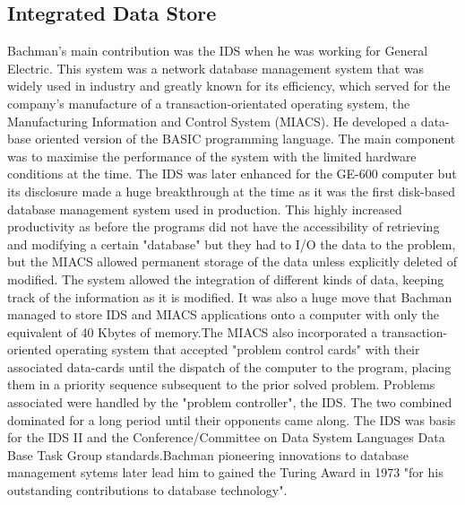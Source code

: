 \documentclass[a4paper]{article}
\begin{document}
\subsection{Integrated Data Store}
Bachman's main contribution was the IDS when he was working for General Electric. This system was a network database management system that was widely used in industry and greatly known for its efficiency, which served for the company's manufacture of a transaction-orientated operating system, the Manufacturing Information and Control System (MIACS). He developed a data-base oriented version of the BASIC programming language. The main component was to maximise the performance of the system with the limited hardware conditions at the time.
\bigbreak
The IDS was later enhanced for the GE-600 computer but its disclosure  made a huge breakthrough at the time as it was the first disk-based database management system used in production. This highly increased productivity as before the programs did not have the accessibility of retrieving and modifying a certain "database" but they had to I/O the data to the problem, but the MIACS allowed permanent storage of the data unless explicitly deleted of modified. The system allowed the integration of different kinds of data, keeping track of the information as it is modified. It was also a huge move that Bachman managed to store IDS and MIACS applications onto a computer with only the equivalent of 40 Kbytes of memory.The MIACS also incorporated a transaction-oriented operating system that accepted "problem control cards" with their associated data-cards until the dispatch of the computer to the program, placing them in a priority sequence subsequent to the prior solved problem. Problems associated were handled by the "problem controller", the IDS. The two combined dominated for a long period until their opponents came along.\cite{award, histmuseam}
\bigbreak
The IDS was basis for the IDS II and the Conference/Committee on Data System Languages Data Base Task Group standards\cite{ids}.Bachman pioneering innovations to database management sytems later lead him to gained the Turing Award in 1973 "for his outstanding contributions to database technology"\cite{award}.
\newpage
\end{document}
